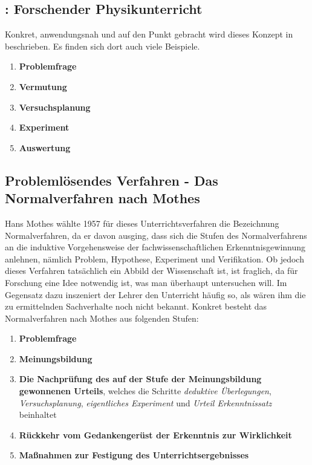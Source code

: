 \subsection{\textcite{Ploeger}: Forschender Physikunterricht}

Konkret, anwendungsnah und auf den Punkt gebracht wird dieses Konzept in
\textcite{Ploeger} beschrieben.
Es finden sich dort auch viele Beispiele.
\begin{enumerate}
	\item {\bf Problemfrage}
	\item {\bf Vermutung}
	\item {\bf Versuchsplanung}
	\item {\bf Experiment}
	\item {\bf Auswertung}
\end{enumerate}

\subsection{Probleml\"{o}sendes Verfahren - Das Normalverfahren nach Mothes}

Hans Mothes w\"{a}hlte 1957 f\"{u}r dieses Unterrichtsverfahren die Bezeichnung \glqq Normalverfahren\grqq, da er davon ausging, dass sich die Stufen des Normalverfahrens an die induktive Vorgehensweise der fachwissenschaftlichen Erkenntnisgewinnung anlehnen, n\"{a}mlich Problem, Hypothese, Experiment und Verifikation. Ob jedoch dieses Verfahren tats\"{a}chlich ein Abbild der Wissenschaft ist, ist fraglich, da f\"{u}r Forschung eine Idee notwendig ist, was man \"{u}berhaupt untersuchen will. Im Gegensatz dazu inszeniert der Lehrer den Unterricht h\"{a}ufig so, als w\"{a}ren ihm die zu ermittelnden Sachverhalte noch nicht bekannt. Konkret besteht das Normalverfahren nach Mothes aus folgenden Stufen:

\begin{enumerate}
	\item {\bf Problemfrage}
	\item {\bf Meinungsbildung}
	\item {\bf Die Nachpr\"{u}fung des auf der Stufe der Meinungsbildung gewonnenen Urteils}, welches die Schritte \emph{deduktive \"{U}berlegungen}, \emph{Versuchsplanung},  \emph{eigentliches Experiment} und \emph{Urteil Erkenntnissatz} beinhaltet
	\item {\bf R\"{u}ckkehr vom Gedankenger\"{u}st der Erkenntnis zur Wirklichkeit}
	\item {\bf Ma\ss nahmen zur Festigung des Unterrichtsergebnisses}
\end{enumerate}

